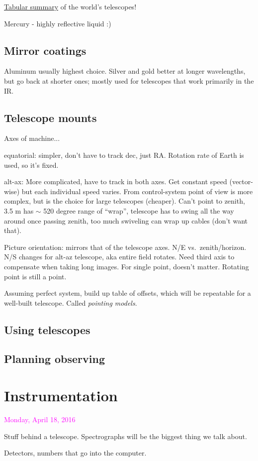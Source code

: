 \documentclass[12pt]{article}
\begin{document}
\href{http://astro.nineplanets.org/bigeyes.html}{Tabular summary}
of the world's telescopes!

Mercury - highly reflective liquid :)

\subsection*{Mirror coatings}
Aluminum usually highest choice. Silver and gold better at longer wavelengths,
but go back at shorter ones; mostly used for telescopes that work primarily
in the IR\@.

\subsection*{Telescope mounts}
Axes of machine...
\begin{itemize*}
    \item equatorial: simpler, don't have to track dec, just RA. Rotation rate
        of Earth is used, so it's fixed.
    \item alt-ax: More complicated, have to track in both axes. Get constant speed
        (vector-wise) but each individual speed varies. From control-system point
        of view is more complex, but is the choice for large telescopes
        (cheaper). Can't point to zenith, 3.5 m has $\sim$ 520 degree range
        of ``wrap'', telescope has to swing all the way around once passing
        zenith, too much swiveling can wrap up cables (don't want that).
\end{itemize*}
Picture orientation:  mirrors that of the telescope axes. N/E vs.\ zenith/horizon.
N/S changes for alt-az telescope, aka entire field rotates. Need third axis to
compensate when taking long images. For single point, doesn't matter. Rotating
point is still a point.

Assuming perfect system, build up table of offsets, which will be repeatable
for a well-built telescope. Called \emph{pointing models}.

\subsection{Using telescopes}
\subsection{Planning observing}
\section{Instrumentation}
\textcolor{magenta}{Monday, April 18, 2016}

Stuff behind a telescope. Spectrographs will be the biggest thing we
talk about.

Detectors, numbers that go into the computer.
\end{document}
